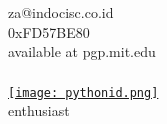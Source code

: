 \documentclass[xcolor=pdftex,table,10pt]{beamer}
\begin{document}
\begin{frame}
	\frametitle{}
	\begin{center}
		za@indocisc.co.id \\
		0xFD57BE80 \\
		available at pgp.mit.edu \\
	\end{center}
\end{frame}

\begin{frame}
	\frametitle{}
	\begin{center}
		\href{http://www.python.or.id}{\texttt{[image: pythonid.png]}} \\
		enthusiast \\
	\end{center}
\end{frame}

%	
%
\end{document}
